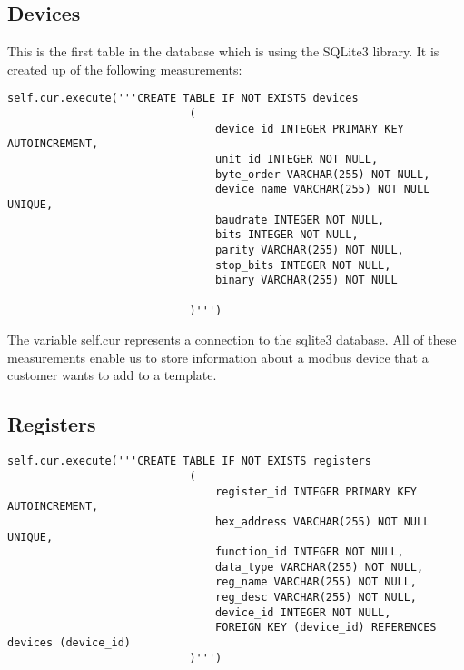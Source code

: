 \documentclass[a4paper,12pt, notitlepage]{article}
\begin{document}
\subsection{Devices}

This is the first table in the database which is using the SQLite3 library. It is created up of the following measurements:

\begin{lstlisting}[caption={The creation of the 'devices' table.},label={lst: dblist}]
 self.cur.execute('''CREATE TABLE IF NOT EXISTS devices
                            (
                                device_id INTEGER PRIMARY KEY AUTOINCREMENT,
                                unit_id INTEGER NOT NULL,
                                byte_order VARCHAR(255) NOT NULL,
                                device_name VARCHAR(255) NOT NULL UNIQUE,
                                baudrate INTEGER NOT NULL,
                                bits INTEGER NOT NULL,
                                parity VARCHAR(255) NOT NULL,
                                stop_bits INTEGER NOT NULL,
                                binary VARCHAR(255) NOT NULL
                                
                            )''')
\end{lstlisting}
The variable self.cur represents a connection to the sqlite3 database. All of these measurements enable us to store information about a modbus device that a customer wants to add to a template.

\subsection{Registers}

\begin{lstlisting}[caption={The creation of the 'registers' table.},label={lst: dbreglist}]
 self.cur.execute('''CREATE TABLE IF NOT EXISTS registers 
                            (
                                register_id INTEGER PRIMARY KEY AUTOINCREMENT,
                                hex_address VARCHAR(255) NOT NULL UNIQUE,
                                function_id INTEGER NOT NULL,
                                data_type VARCHAR(255) NOT NULL,
                                reg_name VARCHAR(255) NOT NULL,
                                reg_desc VARCHAR(255) NOT NULL,
                                device_id INTEGER NOT NULL,
                                FOREIGN KEY (device_id) REFERENCES devices (device_id)
                            )''')
\end{lstlisting}
\end{document}
